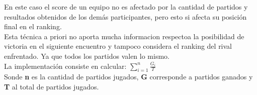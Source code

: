 En este caso el score de un equipo no es afectado por la cantidad de partidos y resultados obtenidos de los demás participantes, pero esto si afecta su posición final en el ranking. \\

Esta técnica a priori no aporta mucha informacion respectoa la posibilidad de victoria en el siguiente encuentro y tampoco considera el ranking del rival enfrentado.
Ya que todos los partidos valen lo mismo. \\

La implementación consiste en calcular: $\sum_{i=1}^n{} \frac{G_i}{T}$ \\

Sonde \textbf{n} es la cantidad de partidos jugados, \textbf{G} corresponde a partidos ganados y \textbf{T} al total de partidos jugados. \\
